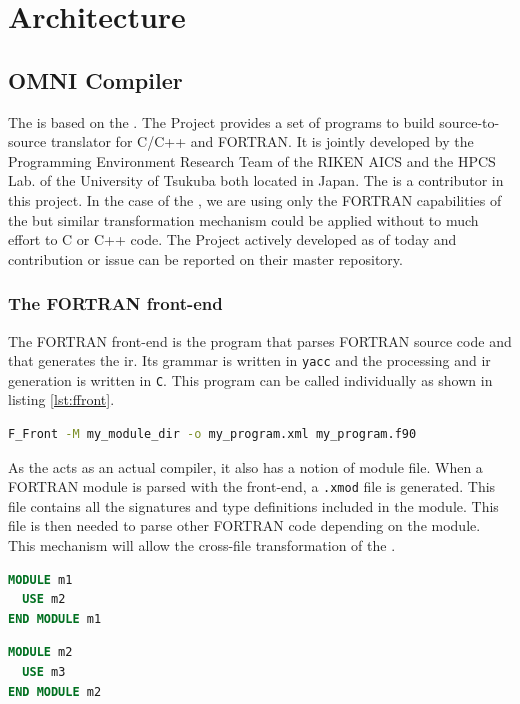 \chapter{Architecture}
\section{OMNI Compiler}
The \clawfcomp is based on the \omni\cite{omni:website}. The \omni Project
provides a set of programs to build source-to-source translator for C/C++
and FORTRAN. It is jointly developed by the Programming Environment Research
Team of the RIKEN AICS and the HPCS Lab. of the University of Tsukuba both
located in Japan. The \clawfcomp is a contributor in this project. 
In the case of the \clawfcomp, we are using only the FORTRAN
capabilities of the \omni but similar transformation mechanism could be
applied without to much effort to C or C++ code. The \omni Project
actively developed as of today and contribution or issue can be reported on 
their master repository\cite{omni:github}.

\subsection{The FORTRAN front-end}
The FORTRAN front-end is the program that parses FORTRAN source code and that
generates the \gls{ir}. Its grammar is written in \lstinline|yacc| and the
processing and \gls{ir} generation is written in \lstinline|C|. This program
can be called individually as shown in listing \ref{lst:ffront}.

\begin{lstlisting}[label=lst:ffront, language=Bash, caption=Call F\_Front]
F_Front -M my_module_dir -o my_program.xml my_program.f90
\end{lstlisting}

As the \omni acts as an actual compiler, it also has a notion of module file. 
When a FORTRAN module is parsed with the front-end, a \lstinline|.xmod| file is
generated. This file contains all the signatures and type definitions included 
in the module. This file is then needed to parse other FORTRAN code depending 
on the module. This mechanism will allow the cross-file transformation of the
\clawfcomp.

\begin{lstlisting}[label=lst:m1, language=Fortran, caption=module\_m1.f90]
MODULE m1
  USE m2
END MODULE m1
\end{lstlisting}

\begin{lstlisting}[label=lst:m2, language=Fortran, caption=module\_m2.f90]
MODULE m2
  USE m3
END MODULE m2
\end{lstlisting}

